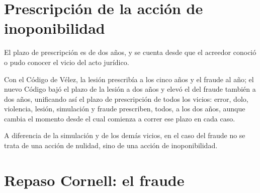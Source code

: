 \documentclass[12pt,oneside]{book}
\begin{document}
\section{Prescripción de la acción de inoponibilidad}

El plazo de prescripción es de dos años, y se cuenta desde que el acreedor conoció o pudo conocer el vicio del acto jurídico.

\begin{important}
Con el Código de Vélez, la lesión prescribía a los cinco años y el fraude al año; el nuevo Código bajó el plazo de la lesión a dos años y elevó el del fraude también a dos años, unificando así el plazo de prescripción de todos los vicios: error, dolo, violencia, lesión, simulación y fraude prescriben, todos, a los dos años, aunque cambia el momento desde el cual comienza a correr ese plazo en cada caso.
\end{important}

A diferencia de la simulación y de los demás vicios, en el caso del fraude no se trata de una acción de nulidad, sino de una acción de inoponibilidad.

\section*{Repaso Cornell: el fraude}
\end{document}
